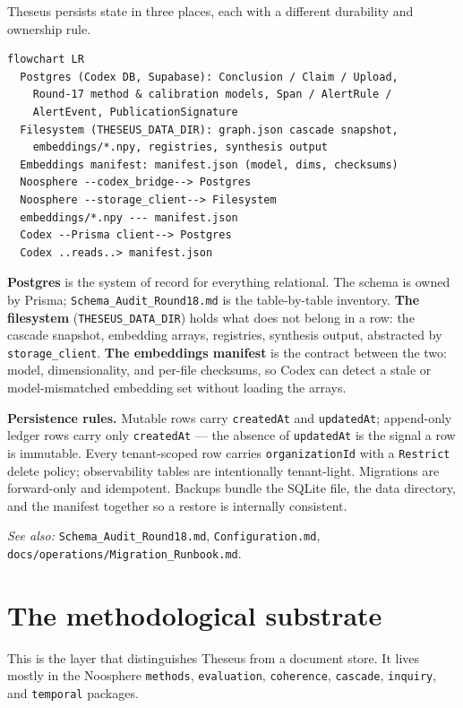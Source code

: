 \documentclass[11pt]{article}
\begin{document}
Theseus persists state in three places, each with a different durability and
ownership rule.

\begin{Verbatim}[frame=single,fontsize=\small]
flowchart LR
  Postgres (Codex DB, Supabase): Conclusion / Claim / Upload,
    Round-17 method & calibration models, Span / AlertRule /
    AlertEvent, PublicationSignature
  Filesystem (THESEUS_DATA_DIR): graph.json cascade snapshot,
    embeddings/*.npy, registries, synthesis output
  Embeddings manifest: manifest.json (model, dims, checksums)
  Noosphere --codex_bridge--> Postgres
  Noosphere --storage_client--> Filesystem
  embeddings/*.npy --- manifest.json
  Codex --Prisma client--> Postgres
  Codex ..reads..> manifest.json
\end{Verbatim}

\textbf{Postgres} is the system of record for everything relational. The
schema is owned by Prisma; \texttt{Schema\_Audit\_Round18.md} is the
table-by-table inventory. \textbf{The filesystem} (\texttt{THESEUS\_DATA\_DIR})
holds what does not belong in a row: the cascade snapshot, embedding arrays,
registries, synthesis output, abstracted by \texttt{storage\_client}.
\textbf{The embeddings manifest} is the contract between the two: model,
dimensionality, and per-file checksums, so Codex can detect a stale or
model-mismatched embedding set without loading the arrays.

\textbf{Persistence rules.} Mutable rows carry \texttt{createdAt} and
\texttt{updatedAt}; append-only ledger rows carry only \texttt{createdAt} ---
the absence of \texttt{updatedAt} is the signal a row is immutable. Every
tenant-scoped row carries \texttt{organizationId} with a \texttt{Restrict}
delete policy; observability tables are intentionally tenant-light. Migrations
are forward-only and idempotent. Backups bundle the SQLite file, the data
directory, and the manifest together so a restore is internally consistent.

\textit{See also:} \texttt{Schema\_Audit\_Round18.md},
\texttt{Configuration.md}, \texttt{docs/operations/Migration\_Runbook.md}.

\section{The methodological substrate}

This is the layer that distinguishes Theseus from a document store. It lives
mostly in the Noosphere \texttt{methods}, \texttt{evaluation},
\texttt{coherence}, \texttt{cascade}, \texttt{inquiry}, and \texttt{temporal}
packages.
\end{document}
